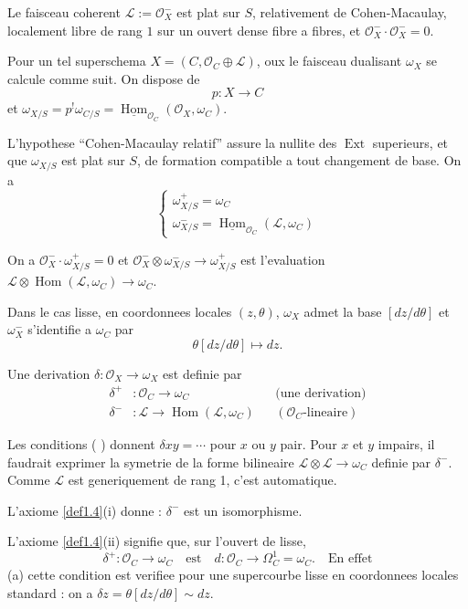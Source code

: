 \documentclass[11pt,a4paper]{article}
\theoremstyle{plain}
\theoremstyle{definition}
\DeclareMathOperator{\Ext}{Ext}
\DeclareMathOperator{\Hom}{Hom}
\begin{document}
Le faisceau coherent $\mathcal{L} := \mathcal{O}_X^-$ est plat sur $S$, relativement de Cohen-Macaulay, localement libre de rang $1$ sur un ouvert dense fibre a fibres, et $\mathcal{O}_X^- \cdot \mathcal{O}_X^- = 0$.

Pour un tel superschema $X = (C, \mathcal{O}_C \oplus \mathcal{L})$, oux le faisceau dualisant $\omega_X$ se calcule comme suit. On dispose de
\[
p : X \longrightarrow C
\]
et $\omega_{X/S} = p^!\omega_{C/S} = \underline{\Hom}_{\mathcal{O}_C}(\mathcal{O}_X, \omega_C)$.

L'hypothese ``Cohen-Macaulay relatif'' assure la nullite des $\Ext$ superieurs, et que $\omega_{X/S}$ est plat sur $S$, de formation compatible a tout changement de base. On a
\[
\begin{cases}
\omega_{X/S}^+ = \omega_C \\ \omega_{X/S}^- = \underline{\Hom}_{\mathcal{O}_C}(\mathcal{L}, \omega_C)
\end{cases}
\]

On a $\mathcal{O}_X^- \cdot \omega_{X/S}^+ = 0$ et $\mathcal{O}_X^- \otimes \omega_{X/S}^- \to \omega_{X/S}^+$ est l'evaluation $\mathcal{L} \otimes \Hom(\mathcal{L},\omega_C) \to \omega_C$.

\newpage

Dans le cas lisse, en coordonnees locales $(z,\theta)$, $\omega_X$ admet la base $[dz/d\theta]$ et $\omega_X^-$ s'identifie a $\omega_C$ par
\[
\theta[dz/d\theta] \longmapsto dz.
\]

Une derivation $\delta : \mathcal{O}_X \to \omega_X$ est definie par
\[
\begin{aligned}
\delta^+ &: \mathcal{O}_C \longrightarrow \omega_C && \text{(une derivation)} \\
\delta^- &: \mathcal{L} \longrightarrow \Hom(\mathcal{L}, \omega_C) && (\mathcal{O}_C\text{-lineaire})
\end{aligned}
\]

Les conditions ( ) donnent $\delta xy = \cdots$ pour $x$ ou $y$ pair. Pour $x$ et $y$ impairs, il faudrait exprimer la symetrie de la forme bilineaire $\mathcal{L} \otimes \mathcal{L} \to \omega_C$ definie par $\delta^-$. Comme $\mathcal{L}$ est generiquement de rang 1, c'est automatique.

L'axiome \ref{def1.4}(i) donne : $\delta^-$ est un isomorphisme.

L'axiome \ref{def1.4}(ii) signifie que, sur l'ouvert de lisse,
\[
\delta^+ : \mathcal{O}_C \to \omega_C \quad \text{est} \quad d : \mathcal{O}_C \to \Omega^1_C = \omega_C. \quad \text{En effet}
\]
(a) cette condition est verifiee pour une supercourbe lisse en coordonnees locales standard : on a $\delta z = \theta[dz/d\theta] \sim dz$.
\end{document}
